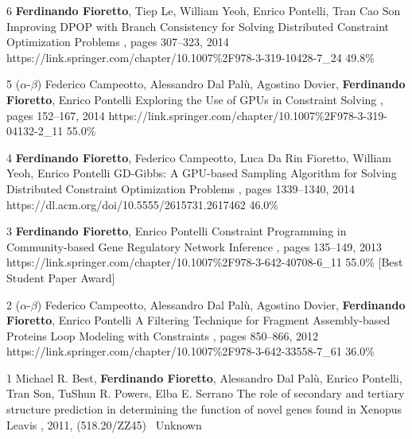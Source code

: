 \begin{pubs}
	\confentry
		{6} %
		{{\bf Ferdinando Fioretto}, Tiep Le, William Yeoh, Enrico Pontelli, Tran Cao Son}
		{Improving DPOP with Branch Consistency for Solving Distributed Constraint Optimization Problems}
		{\procCP, pages 307--323, 2014}
		{https://link.springer.com/chapter/10.1007\%2F978-3-319-10428-7\_24}
		{49.8\%}

	\confentry
		{5} %
		{($\alpha$-$\beta$) 
		Federico Campeotto, Alessandro Dal Pal\`{u}, Agostino Dovier, {\bf Ferdinando Fioretto}, Enrico Pontelli}
		{Exploring the Use of GPUs in Constraint Solving}
		{\procPADL, pages 152--167, 2014}
		{https://link.springer.com/chapter/10.1007\%2F978-3-319-04132-2\_11}
		{55.0\%}

	\confentry 
		{4} %
		{{\bf Ferdinando Fioretto}, Federico Campeotto, Luca Da Rin Fioretto, William Yeoh, Enrico Pontelli} 
		{GD-Gibbs: A GPU-based Sampling Algorithm for Solving Distributed Constraint Optimization Problems} %
		{\procAAMAS, pages 1339--1340, 2014}
		{https://dl.acm.org/doi/10.5555/2615731.2617462}
		{46.0\%}

	\confentryAwd
		{3} %
		{{\bf Ferdinando Fioretto}, Enrico Pontelli} 
		{Constraint Programming in Community-based Gene Regulatory Network Inference} 
		{\procCMSB, pages 135--149, 2013}
		{https://link.springer.com/chapter/10.1007\%2F978-3-642-40708-6\_11}
		{55.0\%}
		{[Best Student Paper Award]}{}

	\confentry 
		{2} %
		{($\alpha$-$\beta$) 
		Federico Campeotto, Alessandro Dal Pal\`{u}, Agostino Dovier, {\bf Ferdinando Fioretto}, Enrico Pontelli}
		{A Filtering Technique for Fragment Assembly-based Proteins Loop Modeling with Constraints} 
		{\procCP, pages 850--866, 2012}
		{https://link.springer.com/chapter/10.1007\%2F978-3-642-33558-7\_61}
		{36.0\%}

	\confentry
		{1} %
		{Michael R. Best, {\bf Ferdinando Fioretto}, Alessandro Dal Pal\`{u}, Enrico Pontelli, Tran Son, TuShun R. Powers, Elba E. Serrano}
		{The role of secondary and tertiary structure prediction in determining the function of novel genes found in Xenopus Leavis}
		{, 2011, (518.20/ZZ45)}{~}
		{Unknown}
\end{pubs}


